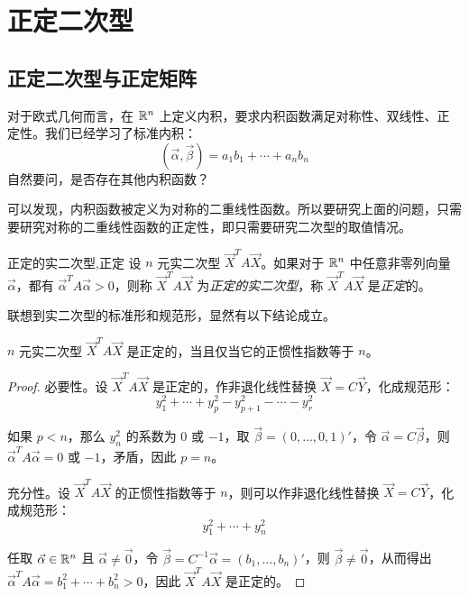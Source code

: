 
\section{正定二次型}

\subsection{正定二次型与正定矩阵}

对于欧式几何而言，在 $\mathbb R^n$ 上定义内积，要求内积函数满足对称性、双线性、正定性。我们已经学习了标准内积：
$$
(\vec \alpha, \vec \beta) = a_1 b_1 + \cdots + a_n b_n
$$
自然要问，是否存在其他内积函数？

可以发现，内积函数被定义为对称的二重线性函数。所以要研究上面的问题，只需要研究对称的二重线性函数的正定性，即只需要研究二次型的取值情况。

\begin{definition}{正定的实二次型,正定}
	设 $n$ 元实二次型 $\vec X^T A \vec X$。如果对于 $\mathbb R^n$ 中任意非零列向量 $\vec \alpha$，都有 $\vec \alpha^T A \vec \alpha > 0$，则称 $\vec X^T A \vec X$ 为\emph{正定的实二次型}，称 $\vec X^T A \vec X$ 是\emph{正定}的。
\end{definition}

联想到实二次型的标准形和规范形，显然有以下结论成立。

\begin{theorem}
	$n$ 元实二次型 $\vec X^T A \vec X$ 是正定的，当且仅当它的正惯性指数等于 $n$。
\end{theorem}

\begin{proof}
	必要性。设 $\vec X^T A \vec X$ 是正定的，作非退化线性替换 $\vec X = C \vec Y$，化成规范形：
	$$
	y_1^2 + \cdots + y_p^2 - y_{p + 1}^2 - \cdots - y_r^2
	$$

	如果 $p < n$，那么 $y_n^2$ 的系数为 $0$ 或 $-1$，取 $\vec \beta = (0, \ldots, 0, 1)'$，令 $\vec \alpha = C \vec  \beta$，则 $\vec \alpha^T A \vec \alpha = 0$ 或 $-1$，矛盾，因此 $p = n$。

	\bigskip

	充分性。设 $\vec X^T A \vec X$ 的正惯性指数等于 $n$，则可以作非退化线性替换 $\vec X = C \vec Y$，化成规范形：
	$$
	y_1^2 + \cdots + y_n^2
	$$

	任取 $\vec \alpha \in \mathbb R^n$ 且 $\vec \alpha \ne \vec 0$，令 $\vec \beta = C^{-1} \vec \alpha = (b_1, \ldots, b_n)'$，则 $\vec \beta \ne \vec 0$，从而得出 $\vec \alpha^T A \vec \alpha = b_1^2 + \cdots + b_n^2 > 0$，因此 $\vec X^T A \vec X$ 是正定的。
\end{proof}

